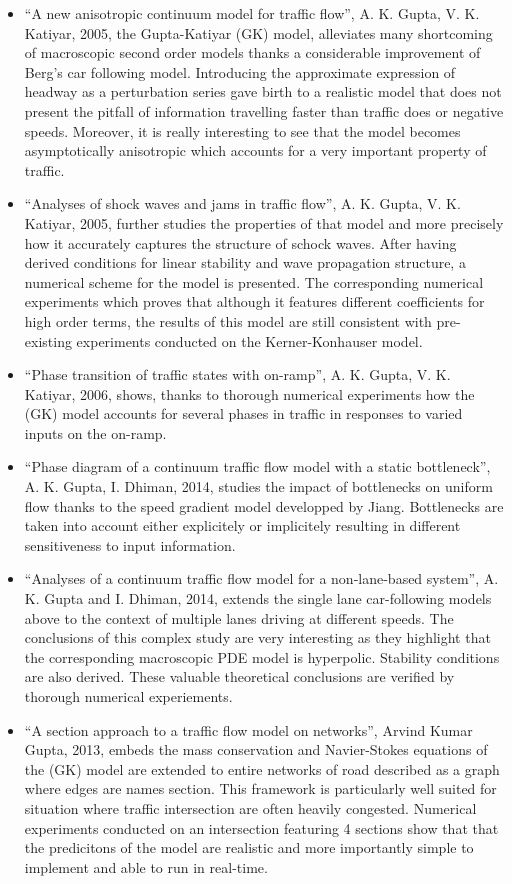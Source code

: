 \documentclass{article}
\begin{document}
\begin{itemize}
\item ``A new anisotropic continuum model for traffic flow'', A. K. Gupta, V. K. Katiyar, 2005, the Gupta-Katiyar (GK) model, alleviates many shortcoming of macroscopic second order models thanks a considerable improvement of Berg's car following model. Introducing the approximate expression of headway as a perturbation series gave birth to a realistic model that does not present the pitfall of information travelling faster than traffic does or negative speeds. Moreover, it is really interesting to see that the model becomes asymptotically anisotropic which accounts for a very important property of traffic.
\item ``Analyses of shock waves and jams in traffic flow'', A. K. Gupta, V. K. Katiyar, 2005, further studies the properties of that model and more precisely how it accurately captures the structure of schock waves. After having derived conditions for linear stability and wave propagation structure, a numerical scheme for the model is presented. The corresponding numerical experiments which proves that although it features different coefficients for high order terms, the results of this model are still consistent with pre-existing experiments conducted on the Kerner-Konhauser model.
\item ``Phase transition of traffic states with on-ramp'', A. K. Gupta, V. K. Katiyar, 2006, shows, thanks to thorough numerical experiments how the (GK) model accounts for several phases in traffic in responses to varied inputs on the on-ramp.
\item ``Phase diagram of a continuum traffic flow model with a static bottleneck'', A. K. Gupta, I. Dhiman, 2014, studies the impact of bottlenecks on uniform flow thanks to the speed gradient model developped by Jiang. Bottlenecks are taken into account either explicitely or implicitely resulting in different sensitiveness to input information.
\item ``Analyses of a continuum traffic flow model for a non-lane-based system'', A. K. Gupta and I. Dhiman, 2014, extends the single lane car-following models above to the context of multiple lanes driving at different speeds. The conclusions of this complex study are very interesting as they highlight that the corresponding macroscopic PDE model is hyperpolic. Stability conditions are also derived. These valuable theoretical conclusions are verified by thorough numerical experiements.
\item ``A section approach to a traffic flow model on networks'', Arvind Kumar Gupta, 2013, embeds the mass conservation and Navier-Stokes equations of the (GK) model are extended to entire networks of road described as a graph where edges are names section. This framework is particularly well suited for situation where traffic intersection are often heavily congested. Numerical experiments conducted on an intersection featuring 4 sections show that that the predicitons of the model are realistic and more importantly simple to implement and able to run in real-time.
\end{itemize}
\end{document}
